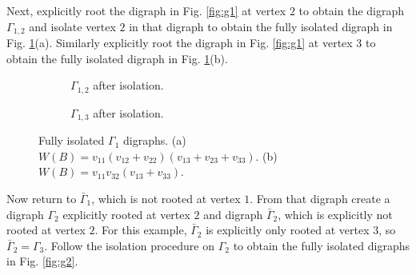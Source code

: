 \documentclass[review,supplement,hidelinks,onefignum,onetabnum]{siamart220329}
\begin{document}
Next, explicitly root the digraph in Fig. \ref{fig:g1} at vertex $2$ to obtain the digraph $\Gamma_{1,2}$ and isolate vertex $2$ in that digraph to obtain the fully isolated digraph in Fig. \ref{fig:g1_23}(a).  Similarly explicitly root the digraph in Fig. \ref{fig:g1} at vertex $3$ to obtain the fully isolated digraph in Fig. \ref{fig:g1_23}(b).

\begin{figure}[htb!]
\centering 
  \begin{subfigure}[b]{0.25\textwidth}
  \centering
    \caption{$\Gamma_{1,2}$ after isolation.}  
  \end{subfigure} 
  \hspace{6em}
  \begin{subfigure}[b]{0.25\textwidth}
  \centering
    \caption{$\Gamma_{1,3}$ after isolation.}
    \end{subfigure}

    \caption{Fully isolated $\Gamma_1$ digraphs.  (a) $W(B) = v_{11}(v_{12}+v_{22})(v_{13}+v_{23}+v_{33})$. (b) $W(B) = v_{11}v_{32}(v_{13}+v_{33})$.}
\label{fig:g1_23}
\end{figure}

Now return to ${\bar \Gamma}_1$, which is not rooted at vertex $1$.  From that digraph create a digraph $\Gamma_2$ explicitly rooted at vertex $2$ and digraph ${\bar \Gamma}_2$, which is explicitly not rooted at vertex $2$.  For this example, ${\bar \Gamma}_2$ is explicitly only rooted at vertex $3$, so ${\bar \Gamma}_2 = \Gamma_3$.  Follow the isolation procedure on $\Gamma_2$ to obtain the fully isolated digraphs in Fig. \ref{fig:g2}.
\end{document}
